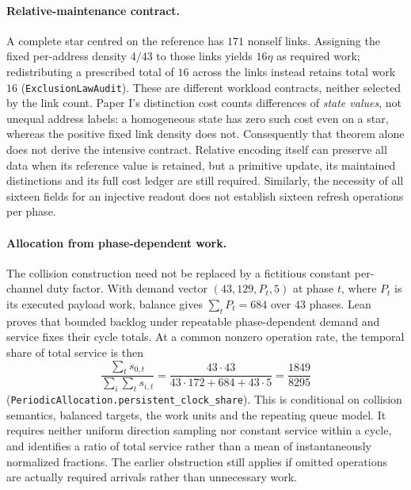 \paragraph{Relative-maintenance contract.}
A complete star centred on the reference has $171$ nonself links. Assigning the
fixed per-address density $4/43$ to those links yields $16\eta$ as required work;
redistributing a prescribed total of $16$ across the links instead retains total
work $16$ (\texttt{ExclusionLawAudit}). These are different workload contracts,
neither selected by the link count. Paper I's distinction cost counts differences
of \emph{state values}, not unequal address labels: a homogeneous state has zero
such cost even on a star, whereas the positive fixed link density does not.
Consequently that theorem alone does not derive the intensive contract.
Relative encoding itself can preserve all data when its reference value is
retained, but a primitive update, its maintained distinctions and its full cost
ledger are still required. Similarly, the necessity of all sixteen fields for
an injective readout does not establish sixteen refresh operations per phase.

\paragraph{Allocation from phase-dependent work.}
The collision construction need not be replaced by a fictitious constant
per-channel duty factor. With demand vector
$(43,129,P_t,5)$ at phase $t$, where $P_t$ is its executed payload work,
balance gives $\sum_tP_t=684$ over $43$ phases. Lean proves that bounded backlog
under repeatable phase-dependent demand and service fixes their cycle totals.
At a common nonzero operation rate, the temporal share of total service is then
\begin{equation}
 \frac{\sum_t s_{0,t}}{\sum_i\sum_t s_{i,t}}
 =\frac{43\cdot43}{43\cdot172+684+43\cdot5}
 =\frac{1849}{8295}
\end{equation}
(\texttt{PeriodicAllocation.persistent\_clock\_share}). This is conditional on
collision semantics, balanced targets, the work units and the repeating queue
model. It requires neither uniform direction sampling nor constant service
within a cycle, and identifies a ratio of total service rather than a mean of
instantaneously normalized fractions. The earlier obstruction still applies
if omitted operations are actually required arrivals rather than unnecessary
work.

